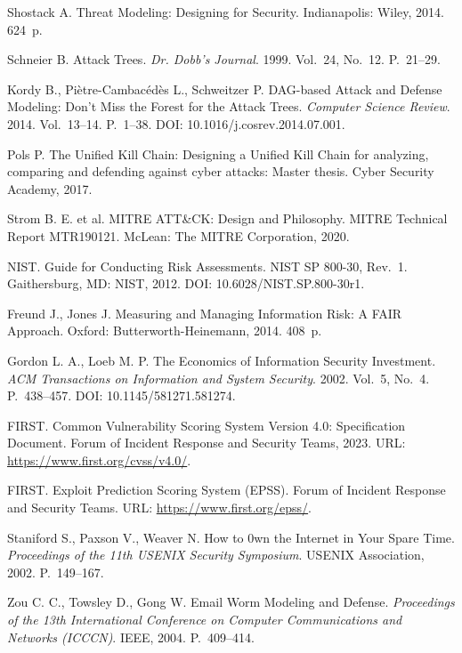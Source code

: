 
 Shostack A. Threat Modeling: Designing for Security. Indianapolis: Wiley, 2014. 624~p.

 Schneier B. Attack Trees. \emph{Dr. Dobb's Journal}. 1999. Vol.~24, No.~12. P.~21--29.

 Kordy B., Piètre-Cambacédès L., Schweitzer P. DAG-based Attack and Defense Modeling: Don't Miss the Forest for the Attack Trees. \emph{Computer Science Review}. 2014. Vol.~13--14. P.~1--38. DOI: 10.1016/j.cosrev.2014.07.001.

 Pols P. The Unified Kill Chain: Designing a Unified Kill Chain for analyzing, comparing and defending against cyber attacks: Master thesis. Cyber Security Academy, 2017.

 Strom B. E. et al. MITRE ATT\&CK: Design and Philosophy. MITRE Technical Report MTR190121. McLean: The MITRE Corporation, 2020.

 NIST. Guide for Conducting Risk Assessments. NIST SP 800-30, Rev.~1. Gaithersburg, MD: NIST, 2012. DOI: 10.6028/NIST.SP.800-30r1.

 Freund J., Jones J. Measuring and Managing Information Risk: A FAIR Approach. Oxford: Butterworth-Heinemann, 2014. 408~p.

 Gordon L. A., Loeb M. P. The Economics of Information Security Investment. \emph{ACM Transactions on Information and System Security}. 2002. Vol.~5, No.~4. P.~438--457. DOI: 10.1145/581271.581274.

 FIRST. Common Vulnerability Scoring System Version 4.0: Specification Document. Forum of Incident Response and Security Teams, 2023. URL: \url{https://www.first.org/cvss/v4.0/}.

 FIRST. Exploit Prediction Scoring System (EPSS). Forum of Incident Response and Security Teams. URL: \url{https://www.first.org/epss/}.

 Staniford S., Paxson V., Weaver N. How to 0wn the Internet in Your Spare Time. \emph{Proceedings of the 11th USENIX Security Symposium}. USENIX Association, 2002. P.~149--167.

 Zou C. C., Towsley D., Gong W. Email Worm Modeling and Defense. \emph{Proceedings of the 13th International Conference on Computer Communications and Networks (ICCCN)}. IEEE, 2004. P.~409--414.

